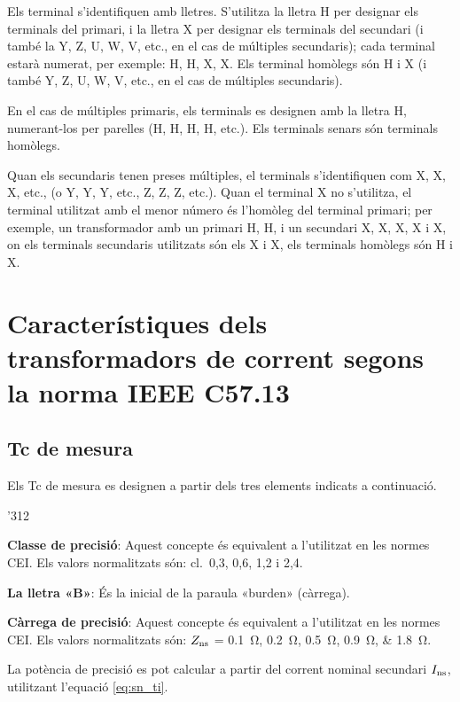 Els terminal s'identifiquen amb lletres. S'utilitza la lletra H per designar els terminals del primari, i la lletra X per designar els terminals del secundari (i també la Y, Z, U, W, V,  etc.{}, en el cas de múltiples secundaris); cada terminal estarà numerat, per exemple: H, H,  X, X. Els terminal homòlegs són H i X (i també Y, Z, U, W, V, etc.{}, en el cas de múltiples secundaris).

En el cas de múltiples primaris, els terminals es designen amb la lletra H, numerant-los per parelles (H, H, H, H, etc.{}). Els terminals senars són terminals homòlegs.

Quan els secundaris tenen preses múltiples, el terminals s'identifiquen com X, X, X, etc.{}, (o Y, Y, Y, etc.{}, Z, Z, Z, etc.{}). Quan el terminal X no s'utilitza, el terminal utilitzat amb el menor número és l'homòleg del terminal primari; per exemple, un transformador amb un primari H, H, i un secundari  X, X, X, X i X, on els terminals secundaris utilitzats són els X i  X, els terminals homòlegs són H i X.


\section{Característiques dels transformadors de corrent segons la norma IEEE C57.13}


\subsection{Tc de mesura}

Els Tc de mesura  es designen a partir
dels tres elements indicats a continuació.

\begin{dingautolist}{'312}
    \item \textbf{Classe de precisió}: Aquest concepte és equivalent
    a l'utilitzat en les normes CEI. Els valors
    normalitzats són: cl.~0,3, 0,6, 1,2 i 2,4.
    \item \textbf{La lletra «B»}: És la inicial de la paraula
    «burden»  (càrrega).
    \item \textbf{Càrrega de precisió}: Aquest concepte és equivalent
    a l'utilitzat en les normes CEI. Els valors
    normalitzats són: $Z_\mathrm{ns}$ = \SIlist{0,1;0,2;0,5;0,9;1,8}{\ohm}.

    La potència de precisió es pot calcular a partir del
    corrent  nominal secundari $I_\mathrm{ns}$, utilitzant l'equació
    \eqref{eq:sn_ti}.
\end{dingautolist}

